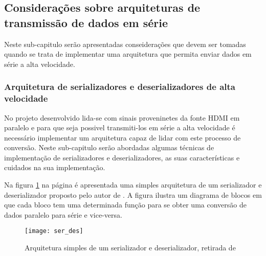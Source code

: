 %

\subsection{Considerações sobre arquiteturas de transmissão de dados em série} \label{serial_theory}
Neste sub-capitulo serão apresentadas conseiderações que devem ser tomadas quando se trata de implementar uma arquitetura que permita enviar dados em série a alta velocidade.
\subsubsection*{Arquitetura de serializadores e deserializadores de alta velocidade}

No projeto desenvolvido lida-se com sinais proveninetes da fonte HDMI em paralelo e para que seja possivel transmiti-los em série a alta velocidade é necessário implementar um arquitetura capaz de lidar com este processo de conversão. Neste sub-capitulo serão abordadas algumas técnicas de implementação de serializadores e deserializadores, as suas características e cuidados na sua implementação.

Na figura \ref{fig:arquiteturaSER} na página \pageref{fig:arquiteturaSER} é apresentada uma simples arquitetura de um serializador e deserializador proposto pelo autor de \cite{R032}. A figura ilustra um diagrama de blocos em que cada bloco tem uma determinada função para se obter uma conversão de dados paralelo para série e vice-versa.

\begin{figure}[h!]
	\begin{center}
		\leavevmode
		\texttt{[image: ser\_des]}
		\caption{Arquitetura simples de um serializador e deserializador, retirada de \cite{R032}}
		\label{fig:arquiteturaSER}
	\end{center}
\end{figure}

